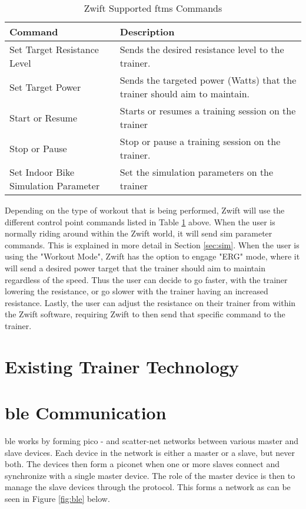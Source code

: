 \begin{table}[h!]
		\renewcommand{\arraystretch}{1.5}
	\centering
	\caption{Zwift Supported \ac{ftms} Commands}
	\begin{tabularx}{\textwidth}{ >{\raggedright}p{4cm} X}
		\toprule
		Command                              & Description                                                               \\
		\midrule
		Set Target Resistance Level          & Sends the desired resistance level to the trainer.                        \\
		Set Target Power                     & Sends the targeted power (Watts) that the trainer should aim to maintain. \\
		Start or Resume                      & Starts or resumes a training session on the trainer                       \\
		Stop or Pause                        & Stop or pause a training session on the trainer.                          \\
		Set Indoor Bike Simulation Parameter & Set the simulation parameters on the trainer                              \\
		\bottomrule
	\end{tabularx}
	\label{tab:blreq}
\end{table}

Depending on the type of workout that is being performed, Zwift will use the different control point commands listed in Table \ref{tab:blreq} above. When the user is normally riding around within the Zwift world, it will send \ac{sim} parameter commands. This is explained in more detail in Section \ref{sec:sim}. When the user is using the "Workout Mode", Zwift has the option to engage "ERG" mode, where it will send a desired power target that the trainer should aim to maintain regardless of the speed. Thus the user can decide to go faster, with the trainer lowering the resistance, or go slower with the trainer having an increased resistance. Lastly, the user can adjust the resistance on their trainer from within the Zwift software, requiring Zwift to then send that specific command to the trainer.

\newpage

\section{Existing Trainer Technology}


\section{\ac{ble} Communication}
\label{sec:ble}
\ac{ble} works by forming pico - and scatter-net networks between various master and slave devices. Each device in the network is either a master or a slave, but never both. The devices then form a piconet when one or more slaves connect and synchronize with a single master device. The role of the master device is then to manage the slave devices through the protocol. This forms a network as can be seen in Figure \ref{fig:ble} below.\\

